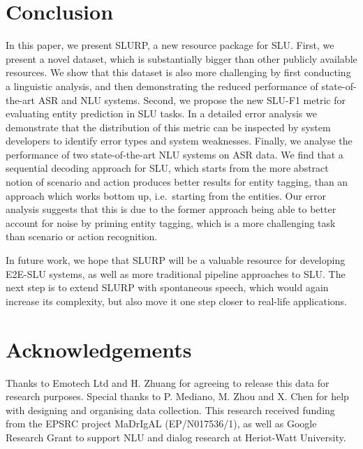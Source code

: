 \documentclass[11pt,a4paper]{article}
\newcommand{\metricname}{SLU-F1}
\newcommand{\datasetacr}{SLURP}
\newcommand{\etoe}{E2E}
\newcommand{\slu}{SLU}
\newcommand{\asr}{ASR}
\newcommand{\nlu}{NLU}
\begin{document}
\section{Conclusion}
\label{sec:conclusion}

In this paper, we present \datasetacr, a new resource package for \slu. 
First, we present a novel dataset, which is substantially bigger than other publicly available resources. We show that this dataset is also more challenging by first conducting a linguistic analysis, and then demonstrating the reduced performance of state-of-the-art \asr{} and \nlu{} systems.
Second, we propose the new \metricname{} metric for evaluating entity prediction in \slu{} tasks. In a detailed error analysis we demonstrate that the distribution of this metric can be inspected by system developers to identify error types and system weaknesses.
Finally, we analyse the performance of two state-of-the-art \nlu{} systems on \asr{} data. We find that a sequential decoding approach for SLU, which starts from the more abstract notion of scenario and action produces better results for entity tagging, than an approach which works bottom up, i.e.\ starting from the entities. Our error analysis suggests that this is due to the former approach being able to better account for noise by priming entity tagging, which is a more challenging task than scenario or action recognition. 

In future work, we hope that \datasetacr{} will be a valuable resource for developing \etoe-\slu{} systems, as well as more traditional pipeline approaches to SLU.
The next step is to extend \datasetacr{} with spontaneous speech, which would again increase its complexity, but also move it one step closer to real-life applications.

\small
\section*{Acknowledgements}
Thanks to Emotech Ltd and H. Zhuang for agreeing to release this data for research purposes. Special thanks to P. Mediano, M. Zhou and X. Chen for help with designing and organising data collection.
This research received funding from the EPSRC project MaDrIgAL (EP/N017536/1), as well as Google Research Grant to support NLU and dialog research at Heriot-Watt University.
\normalsize




\end{document}
